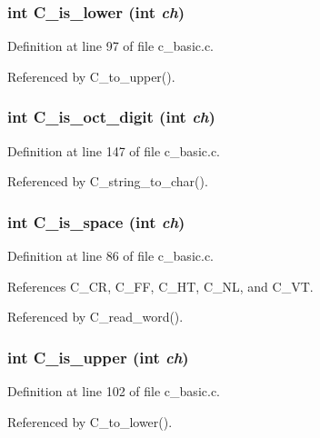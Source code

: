 \subsubsection{\setlength{\rightskip}{0pt plus 5cm}int C\_\-is\_\-lower (int {\em ch})}\label{c__basic_8c_c44d43034c58f3d75a511f23386189d8}




Definition at line 97 of file c\_\-basic.c.

Referenced by C\_\-to\_\-upper().
\subsubsection{\setlength{\rightskip}{0pt plus 5cm}int C\_\-is\_\-oct\_\-digit (int {\em ch})}\label{c__basic_8c_c3259292c22a7cf7a67517f74a588130}




Definition at line 147 of file c\_\-basic.c.

Referenced by C\_\-string\_\-to\_\-char().
\subsubsection{\setlength{\rightskip}{0pt plus 5cm}int C\_\-is\_\-space (int {\em ch})}\label{c__basic_8c_8ee6cd71e0b75f06a42c70d0cfc132f4}




Definition at line 86 of file c\_\-basic.c.

References C\_\-CR, C\_\-FF, C\_\-HT, C\_\-NL, and C\_\-VT.

Referenced by C\_\-read\_\-word().
\subsubsection{\setlength{\rightskip}{0pt plus 5cm}int C\_\-is\_\-upper (int {\em ch})}\label{c__basic_8c_59fceb3eb31dd1aaf2e2040ae2565e0d}




Definition at line 102 of file c\_\-basic.c.

Referenced by C\_\-to\_\-lower().
